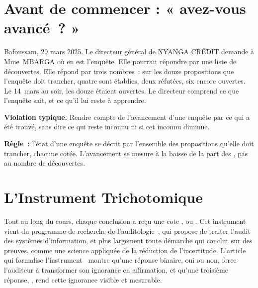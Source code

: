 \section*{Avant de commencer : « avez-vous avancé~? »}

Bafoussam, 29 mars 2025. Le directeur général de NYANGA CRÉDIT demande à
Mme~MBARGA où en est l'enquête. Elle pourrait répondre par une liste de
découvertes. Elle répond par trois nombres~: sur les douze propositions que
l'enquête doit trancher, quatre sont établies, deux réfutées, six encore
ouvertes. Le 14~mars au soir, les douze étaient ouvertes. Le directeur
comprend ce que l'enquête sait, et ce qu'il lui reste à apprendre.

\begin{boxalert}
\textbf{Violation typique.} Rendre compte de l'avancement d'une enquête par
ce qui a été trouvé, sans dire ce qui reste inconnu ni si cet inconnu
diminue.

\smallskip
\textbf{Règle~:} l'état d'une enquête se décrit par l'ensemble des
propositions qu'elle doit trancher, chacune cotée. L'avancement se mesure à
la baisse de la part des \NEK{}, pas au nombre de découvertes.
\end{boxalert}

\separateur

\section{L'Instrument Trichotomique}
\label{sec:c16-instrument}

Tout au long du cours, chaque conclusion a reçu une cote \OUI{}, \NON{} ou
\NEK{}. Cet instrument vient du programme de recherche de
l'auditologie~\cite{minka2026auditologie}, qui propose de traiter l'audit
des systèmes d'information, et plus largement toute démarche qui conclut
sur des preuves, comme une science appliquée de la réduction de
l'incertitude. L'article qui formalise l'instrument~\cite{minka2026nek}
montre qu'une réponse binaire, oui ou non, force l'auditeur à transformer
son ignorance en affirmation, et qu'une troisième réponse, \NEK{}, rend
cette ignorance visible et mesurable.

